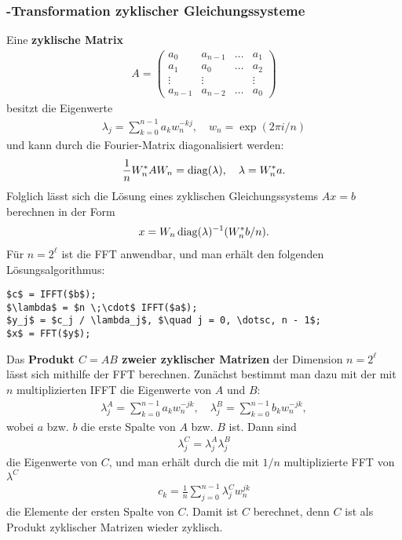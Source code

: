 \pagebreak

\subsubsection{%
    -Transformation zyklischer Gleichungssysteme%
}

Eine \textbf{zyklische Matrix}
\begin{align*}
    A =
    \begin{pmatrix}
        a_0 & a_{n-1} & \dots & a_1 \\
        a_1 & a_0 & \dots & a_2 \\
        \vdots & \vdots & & \vdots \\
        a_{n-1} & a_{n-2} & \dots & a_0
    \end{pmatrix}
\end{align*}
besitzt die Eigenwerte
\begin{align*}
    \lambda_j = \sum_{k=0}^{n-1} a_k w_n^{-kj}, \quad
    w_n = \exp(2 \pi i / n)
\end{align*}
und kann durch die Fourier-Matrix diagonalisiert werden:
\begin{align*}
    \frac{1}{n} W_n^\ast A W_n = \operatorname{diag}(\lambda), \quad
    \lambda = W_n^\ast a.
\end{align*}
Folglich lässt sich die Lösung eines zyklischen Gleichungssystems $Ax = b$
berechnen in der Form
\begin{align*}
    x = W_n \operatorname{diag}(\lambda)^{-1} (W_n^\ast b / n).
\end{align*}
Für $n = 2^\ell$ ist die FFT anwendbar, und man erhält den folgenden
Lösungsalgorithmus:
\begin{lstlisting}[mathescape]
$c$ = IFFT($b$);
$\lambda$ = $n \;\cdot$ IFFT($a$);
$y_j$ = $c_j / \lambda_j$, $\quad j = 0, \dotsc, n - 1$;
$x$ = FFT($y$);
\end{lstlisting}

\linie

Das \textbf{Produkt $C = AB$ zweier zyklischer Matrizen} der Dimension
$n = 2^\ell$ lässt sich mithilfe der FFT berechnen.
Zunächst bestimmt man dazu mit der mit $n$ multiplizierten IFFT die
Eigenwerte von $A$ und $B$:
\begin{align*}
    \lambda_j^A = \sum_{k=0}^{n-1} a_k w_n^{-jk}, \quad
    \lambda_j^B = \sum_{k=0}^{n-1} b_k w_n^{-jk},
\end{align*}
wobei $a$ bzw. $b$ die erste Spalte von $A$ bzw. $B$ ist.
Dann sind
\begin{align*}
    \lambda_j^C = \lambda_j^A \lambda_j^B
\end{align*}
die Eigenwerte von $C$, und man erhält durch die mit $1/n$ multiplizierte FFT
von $\lambda^C$
\begin{align*}
    c_k = \frac{1}{n} \sum_{j=0}^{n-1} \lambda_j^C w_n^{jk}
\end{align*}
die Elemente der ersten Spalte von $C$.
Damit ist $C$ berechnet, denn $C$ ist als Produkt zyklischer Matrizen
wieder zyklisch.

